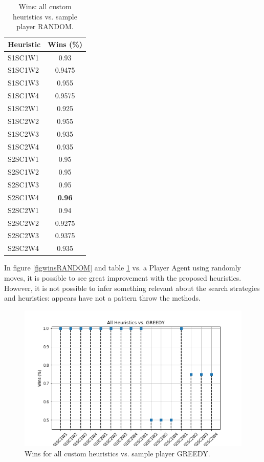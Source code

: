 \documentclass[a4paper]{article}
\begin{document}
    \begin{table}[htpb]
    \caption{ Wins: all custom heuristics vs. sample player RANDOM.}
    \centering
    \begin{tabular}{ l | c }
    Heuristic & Wins (\%) \\ \hline 
    S1SC1W1 & 0.93 \\
    S1SC1W2 & 0.9475 \\
    S1SC1W3 & 0.955 \\
    S1SC1W4 & 0.9575 \\
    S1SC2W1 & 0.925 \\
    S1SC2W2 & 0.955 \\
    S1SC2W3 & 0.935 \\
    S1SC2W4 & 0.935 \\
    S2SC1W1 & 0.95 \\
    S2SC1W2 & 0.95 \\
    S2SC1W3 & 0.95 \\
    S2SC1W4 & \textbf{0.96} \\
    S2SC2W1 & 0.94 \\
    S2SC2W2 & 0.9275 \\
    S2SC2W3 & 0.9375 \\
    S2SC2W4 & 0.935 
    \end{tabular}
    \label{tabwinsRANDOM}
    \end{table}

In figure \ref{figwinsRANDOM} and table \ref{tabwinsRANDOM} vs. a Player Agent using randomly moves, it is possible to see great improvement with the proposed heuristics. However, it is not possible to infer something relevant about the search strategies and heuristics: appears have not a pattern throw the methods.

    


\begin{figure}[htpb]
\begin{center}
\includegraphics[width=1\columnwidth]{fig/results_Wins_All_vs_GREEDY.png}
\caption{Wins for all custom heuristics vs. sample player GREEDY.}
\end{center}
\label{figwinsGREEDY}
\end{figure}
    
\end{document}
